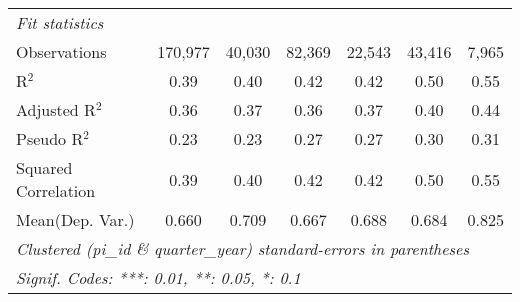 \begin{tabular}{lcccccc}
   \midrule
   \emph{Fit statistics}\\
   Observations                                               & 170,977      & 40,030        & 82,369      & 22,543       & 43,416      & 7,965\\  
   R$^2$                                                      & 0.39         & 0.40          & 0.42        & 0.42         & 0.50        & 0.55\\  
   Adjusted R$^2$                                             & 0.36         & 0.37          & 0.36        & 0.37         & 0.40        & 0.44\\  
   Pseudo R$^2$                                               & 0.23         & 0.23          & 0.27        & 0.27         & 0.30        & 0.31\\  
   Squared Correlation                                        & 0.39         & 0.40          & 0.42        & 0.42         & 0.50        & 0.55\\  
Mean(Dep. Var.) & 0.660 & 0.709 & 0.667 & 0.688 & 0.684 & 0.825 \\
   \midrule \midrule
   \multicolumn{7}{l}{\emph{Clustered (pi\_id \& quarter\_year) standard-errors in parentheses}}\\
   \multicolumn{7}{l}{\emph{Signif. Codes: ***: 0.01, **: 0.05, *: 0.1}}\\
\end{tabular}
\par\endgroup
